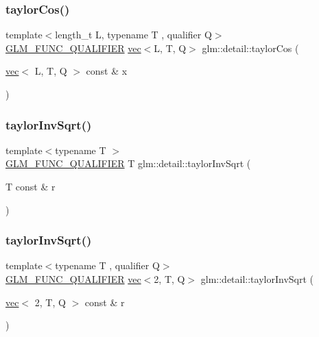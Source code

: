 \subsubsection{\texorpdfstring{taylor\+Cos()}{taylorCos()}}
{\footnotesize\ttfamily template$<$length\+\_\+t L, typename T , qualifier Q$>$ \\
\hyperlink{setup_8hpp_a33fdea6f91c5f834105f7415e2a64407}{G\+L\+M\+\_\+\+F\+U\+N\+C\+\_\+\+Q\+U\+A\+L\+I\+F\+I\+ER} \hyperlink{structglm_1_1vec}{vec}$<$L, T, Q$>$ glm\+::detail\+::taylor\+Cos (\begin{DoxyParamCaption}\item[{\hyperlink{structglm_1_1vec}{vec}$<$ L, T, Q $>$ const \&}]{x }\end{DoxyParamCaption})}

\mbox{\label{namespaceglm_1_1detail_a82e6fa9d633a5f76f8b7e046ac5d91f4}} 
\subsubsection{\texorpdfstring{taylor\+Inv\+Sqrt()}{taylorInvSqrt()}\hspace{0.1cm}{\footnotesize\ttfamily [1/4]}}
{\footnotesize\ttfamily template$<$typename T $>$ \\
\hyperlink{setup_8hpp_a33fdea6f91c5f834105f7415e2a64407}{G\+L\+M\+\_\+\+F\+U\+N\+C\+\_\+\+Q\+U\+A\+L\+I\+F\+I\+ER} T glm\+::detail\+::taylor\+Inv\+Sqrt (\begin{DoxyParamCaption}\item[{T const \&}]{r }\end{DoxyParamCaption})}

\mbox{\label{namespaceglm_1_1detail_aa7082f2eab56cda8156f3ab94e8653a2}} 
\subsubsection{\texorpdfstring{taylor\+Inv\+Sqrt()}{taylorInvSqrt()}\hspace{0.1cm}{\footnotesize\ttfamily [2/4]}}
{\footnotesize\ttfamily template$<$typename T , qualifier Q$>$ \\
\hyperlink{setup_8hpp_a33fdea6f91c5f834105f7415e2a64407}{G\+L\+M\+\_\+\+F\+U\+N\+C\+\_\+\+Q\+U\+A\+L\+I\+F\+I\+ER} \hyperlink{structglm_1_1vec}{vec}$<$2, T, Q$>$ glm\+::detail\+::taylor\+Inv\+Sqrt (\begin{DoxyParamCaption}\item[{\hyperlink{structglm_1_1vec}{vec}$<$ 2, T, Q $>$ const \&}]{r }\end{DoxyParamCaption})}

